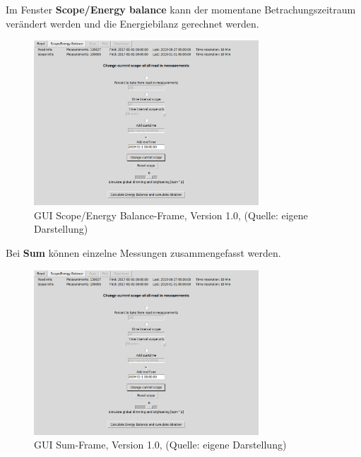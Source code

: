\documentclass[11pt,a4paper]{article}
\newcommand{\guiplotsize}{0.75}
\newcommand{\guiversion}{1.0}
\begin{document}
Im Fenster \textbf{Scope/Energy balance} kann der momentane Betrachungszeitraum verändert werden und die Energiebilanz gerechnet werden. 

\begin{figure}[H]
\centering
\includegraphics[width=\guiplotsize\textwidth]{pictures/GUI/Scope_Energy_Balance_Frame.png}
\caption[GUI Scope/Energy Balance-Frame, Version \guiversion]{GUI Scope/Energy Balance-Frame, Version \guiversion, (Quelle: eigene Darstellung)}
\label{fig:GUI Scope/Energy Balance-Frame}
\end{figure}

Bei \textbf{Sum} können einzelne Messungen zusammengefasst werden.

\begin{figure}[H]
\centering
\includegraphics[width=\guiplotsize\textwidth]{pictures/GUI/Scope_Energy_Balance_Frame.png}
\caption[GUI Sum-Frame, Version \guiversion]{GUI Sum-Frame, Version \guiversion, (Quelle: eigene Darstellung)}
\label{fig:GUI Sum-Frame}
\end{figure}
\end{document}
